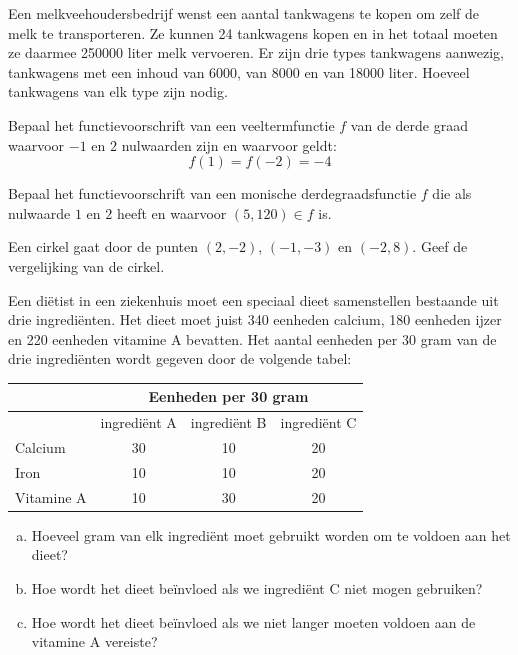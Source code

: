 \documentclass[12pt,twoside]{article}
\begin{document}
\begin{oefening}
Een melkveehoudersbedrijf wenst een aantal tankwagens te kopen om zelf de melk te transporteren. Ze kunnen 24 tankwagens kopen en in het totaal moeten ze daarmee 250000 liter melk vervoeren. Er zijn drie types tankwagens aanwezig, tankwagens met een inhoud van 6000, van 8000 en van 18000 liter. Hoeveel tankwagens van elk type zijn nodig.
\end{oefening}

\begin{oefening}
Bepaal het functievoorschrift van een veeltermfunctie $f$ van de derde graad waarvoor $-1$ en $2$ nulwaarden zijn en waarvoor geldt:
$$f(1)=f(-2)=-4$$
\end{oefening}

\begin{oefening}
Bepaal het functievoorschrift van een monische derdegraadsfunctie $f$ die als nulwaarde $1$ en $2$ heeft en waarvoor $(5,120)\in f$ is.
\end{oefening}

\begin{oefening}
Een cirkel gaat door de punten $(2,-2)$, $(-1, -3)$ en $(-2,8)$. Geef de vergelijking van de cirkel.
\end{oefening}

\begin{oefening}
Een diëtist in een ziekenhuis moet een speciaal dieet samenstellen bestaande uit drie ingrediënten. Het dieet moet juist 340 eenheden calcium, 180 eenheden ijzer en 220 eenheden vitamine A bevatten. Het aantal eenheden per $30$ gram van de drie ingrediënten wordt gegeven door de volgende tabel:
\begin{center}
  \begin{tabular}{lccc}
               &\multicolumn{3}{c}{Eenheden per 30 gram}\\
    \hline
               & ingrediënt A & ingrediënt B & ingrediënt C\\
    \hline
    Calcium    & 30           & 10           & 20\\
    Iron       & 10           & 10           & 20\\
    Vitamine A & 10           & 30           & 20\\
  \end{tabular}
\end{center}
\begin{enumerate}[(a)]
  \item Hoeveel gram van elk ingrediënt moet gebruikt worden om te voldoen aan het dieet?
  \item Hoe wordt het dieet beïnvloed als we ingrediënt C niet mogen gebruiken?
  \item Hoe wordt het dieet beïnvloed als we niet langer moeten voldoen aan de vitamine A vereiste?
\end{enumerate}
\end{oefening}
\end{document}
